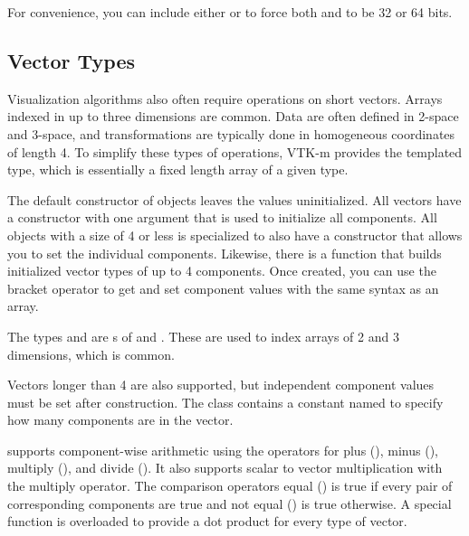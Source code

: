 For convenience, you can include either
 or
 to force both  and
 to be 32 or 64 bits.

\subsection{Vector Types}
\label{sec:VectorTypes}

Visualization algorithms also often require operations on short vectors.
Arrays indexed in up to three dimensions are common. Data are often defined
in 2-space and 3-space, and transformations are typically done in
homogeneous coordinates of length 4. To simplify these types of operations,
VTK-m provides the  templated type, which is
essentially a fixed length array of a given type.

The default constructor of  objects leaves the values
uninitialized. All vectors have a constructor with one argument that is
used to initialize all components. All  objects with a size of 4
or less is specialized to also have a constructor that allows you to set
the individual components. Likewise, there is a  function
that builds initialized vector types of up to 4 components. Once created,
you can use the bracket operator to get and set component values with the
same syntax as an array.


The types  and  are s of
 and . These
are used to index arrays of 2 and 3 dimensions, which is common.

Vectors longer than 4 are also supported, but independent component values
must be set after construction. The  class contains a constant
named  to specify how many
components are in the vector.


 supports component-wise arithmetic using the operators
for plus (\textcode{+}), minus (\textcode{-}), multiply (\textcode{*}), and
divide (\textcode{/}). It also supports scalar to vector multiplication
with the multiply operator. The comparison operators equal (\textcode{==})
is true if every pair of corresponding components are true and not equal
(\textcode{!=}) is true otherwise. A special  function is
overloaded to provide a dot product for every type of vector.


